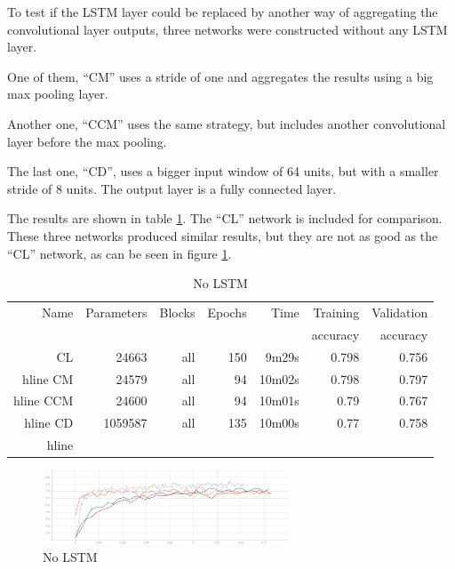 To test if 
the LSTM layer could be replaced by 
another way of aggregating the convolutional layer outputs, three networks were constructed without any LSTM layer.

One of them, ``CM'' uses a stride of one and aggregates the results using a big max pooling layer.

Another one, ``CCM'' uses the same strategy, but includes another convolutional layer before the max pooling.

The last one, ``CD'', uses a bigger input window of 64 units, but with a smaller stride of 8 units. The output layer is a fully connected layer.

The results are shown in table \ref{tab:carvingnolstm}. The ``CL'' network is included for comparison.
These three networks produced similar results, but they are not as good as the ``CL'' network, as can be seen in figure
\ref{fig:nolstm}.


\begin{table}[!ht]
    \centering
    \caption{No LSTM}
    \label{tab:carvingnolstm}
\begin{tabular}{r|r|r|r|r|r|r}
\hline
Name & Parameters & Blocks & Epochs & Time & Training          & Validation          \\       
     &            &        &        &         &          accuracy &            accuracy \\ \hline\hline

CL	    & 24663	    & all	& 150	& 9m29s	    & 0.798	& 0.756 \\hline
CM	    & 24579	    & all	& 94	& 10m02s	& 0.798	& 0.797 \\hline
CCM	    & 24600	    & all	& 94	& 10m01s	& 0.79	& 0.767 \\hline
CD	    & 1059587	& all	& 135	& 10m00s	& 0.77	& 0.758 \\hline
\end{tabular}
\end{table}

\begin{figure}[htb!]
\centering\includegraphics[width=0.65\textwidth]{content/nolstm.png}
\caption{\label{fig:nolstm}No LSTM}%
\end{figure}

